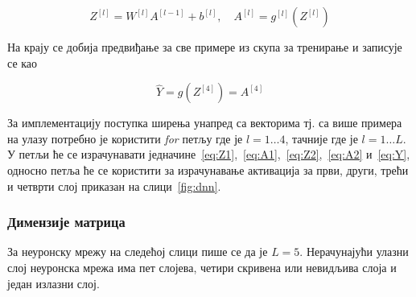 \documentclass[master]{finthesis}
\begin{document}
\begin{equation}
Z^{[l]} = W^{[l]}A^{[l-1]} + b^{[l]}, \quad A^{[l]} = g^{[l]}(Z^{[l]})
\end{equation}

На крају се добија предвиђање за све примере из скупа за тренирање и записује се као

\begin{equation}
\hat{Y} = g(Z^{[4]})=A^{[4]}
\label{eq:Y}
\end{equation}

За имплементацију поступка ширења унапред са векторима тј. са више примера на улазу потребно је користити \textit{for} петљу где је $l=1 \dots 4$, тачније где је $l=1 \dots L$. У петљи ће се израчунавати једначине~\eqref{eq:Z1},~\eqref{eq:A1},~\eqref{eq:Z2},~\eqref{eq:A2} и~\eqref{eq:Y}, односно петља ће се користити за израчунавање активација за први, други, трећи и четврти слој приказан на слици~\ref{fig:dnn}.

\subsubsection{Димензије матрица}

За неуронску мрежу на следећој слици пише се да је $L=5$. Нерачунајући улазни слој неуронска мрежа има пет слојева, четири скривена или невидљива слоја и један излазни слој.
\end{document}
